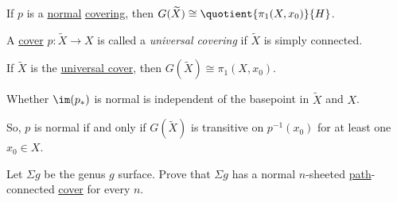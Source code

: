 \begin{corollary}
	If \(p\) is a \hyperref[def:normal]{normal} \hyperref[def:covering-map]{covering}, then \(G(\widetilde{X} ) \cong \quotient{\pi _1(X, x_0)}{H} \).
\end{corollary}

\begin{definition}\label{def:universal-covering}
	A \hyperref[def:covering-map]{cover} \(p\colon \widetilde{X} \to X\) is called a \emph{universal covering} if \(\widetilde{X} \) is simply connected.
\end{definition}
\begin{corollary}
	If \(\widetilde{X} \) is the \hyperref[def:universal-covering]{universal cover}, then \(G(\widetilde{X} )\cong \pi _1(X, x_0)\).
\end{corollary}

\begin{exercise}
	Whether \(\im (p_\ast)\) is normal is independent of the basepoint in \(\widetilde{X} \) and \(X\).
\end{exercise}

So, \(p\) is normal if and only if \(G(\widetilde{X} )\) is transitive on \(p^{-1} (x_0)\) for at least one
\(x_0\in X\).
\begin{exercise}
	Let \(\Sigma g\) be the genus \(g\) surface. Prove that \(\Sigma g\) has a normal \(n\)-sheeted \hyperref[def:path]{path}-connected
	\hyperref[def:covering-map]{cover} for every \(n\).
\end{exercise}
